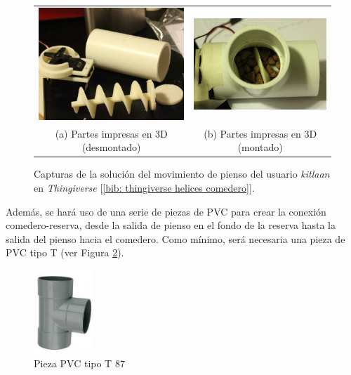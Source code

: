 \documentclass[12pt]{article}
\begin{document}
	\begin{figure}[h!]
		\begin{center}
			\begin{tabular}{cc}
				\includegraphics[width=60mm]{img/thingiverse_helice_1.png} &   \includegraphics[width=60mm]{img/thingiverse_helice_2.png} \\
				(a) Partes impresas en 3D (desmontado) & (b) Partes impresas en 3D (montado)\\[6pt]
			\end{tabular}
			\caption{Capturas de la solución del movimiento de pienso del usuario \textit{kitlaan} en \textit{Thingiverse} [\ref{bib: thingiverse helices comedero}].}
			\label{fig: capturas thingiverse helices kitlaan.}
		\end{center}
	\end{figure}
	
	\noindent Además, se hará uso de una serie de piezas de PVC para crear la conexión comedero-reserva, desde la salida de pienso en el fondo de la reserva hasta la salida del pienso hacia el comedero. Como mínimo, será necesaria una pieza de PVC tipo T (ver Figura \ref{Pieza PVC T}).\\
	
	\pagebreak
	
	
	\begin{figure}[h!]
		\begin{center}
			\includegraphics[width=0.2\textwidth]{img/pieza_pvc_T.png}
			\caption{Pieza PVC tipo T 87\degree [\ref{bib: Nikoi ferreteria}]}
			\label{Pieza PVC T}
		\end{center}
	\end{figure}
	
\end{document}
